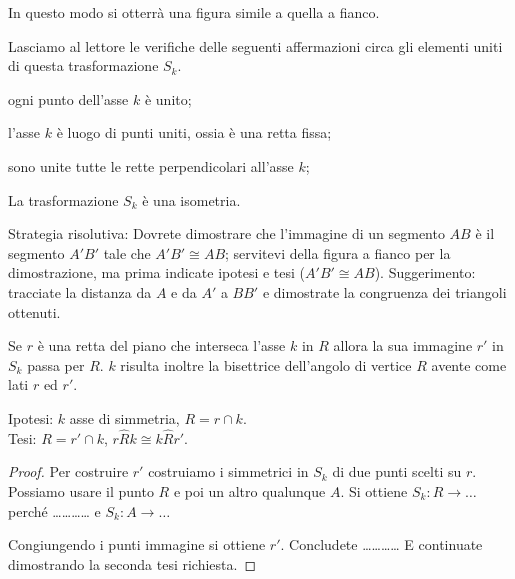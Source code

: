 In questo modo si otterrà una figura simile a quella a fianco.

Lasciamo al lettore le verifiche delle seguenti affermazioni circa 
gli elementi uniti di questa trasformazione $S_k$.
\begin{itemize*}
\item ogni punto dell'asse $k$ è unito;
\item l'asse $k$ è luogo di punti uniti, ossia è una retta fissa;
\item sono unite tutte le rette perpendicolari all'asse $k$;
\end{itemize*}
\setlength{\intextsep}{\defintextsep}

\begin{teorema}\label{teo:8.3}
La trasformazione $S_k$ è una isometria.
\end{teorema}

\noindent\begin{minipage}{0.65\textwidth}\parindent15pt
Strategia risolutiva:
Dovrete dimostrare che l'immagine di un segmento $AB$ è il segmento 
$A'B'$ tale che $A'B'\cong AB$; servitevi della figura a fianco per 
la dimostrazione, ma prima indicate ipotesi e tesi ($A'B'\cong AB$).
Suggerimento: tracciate la distanza da $A$ e da $A'$ a $BB'$ e 
dimostrate la congruenza dei triangoli ottenuti.
\end{minipage}\hfil
\begin{minipage}{0.35\textwidth}
	\centering
\end{minipage}\vspace{5pt}

\begin{teorema}\label{teo:8.4}
Se $r$ è una retta del piano che interseca l'asse $k$ in $R$ allora 
la sua immagine $r'$ in $S_k$ passa per $R$. $k$ risulta inoltre la 
bisettrice dell'angolo di vertice $R$ avente come lati $r$ ed $r'$.
\end{teorema}

\noindent\begin{minipage}{0.65\textwidth}\parindent15pt
\noindent Ipotesi: $k$ asse di simmetria, $R=r\cap k$.\\
Tesi: $R=r'\cap k$, $r\widehat{R}k\cong k\widehat{R}r'$.

\begin{proof}
Per costruire $r'$ costruiamo i simmetrici in $S_k$ di due punti 
scelti su $r$. Possiamo usare il punto $R$ e poi un altro qualunque 
$A$. Si ottiene $S_k: R \rightarrow \ldots{}$ perché 
\ldots\ldots\ldots\ldots{} e $S_k: A \rightarrow \ldots{}$

Congiungendo i punti immagine si ottiene $r'$. Concludete 
\ldots\ldots\ldots\ldots{}
E continuate dimostrando la seconda tesi richiesta.
\end{proof}
\end{minipage}\hfil
\begin{minipage}{0.35\textwidth}
	\centering
\end{minipage}\vspace{5pt}

